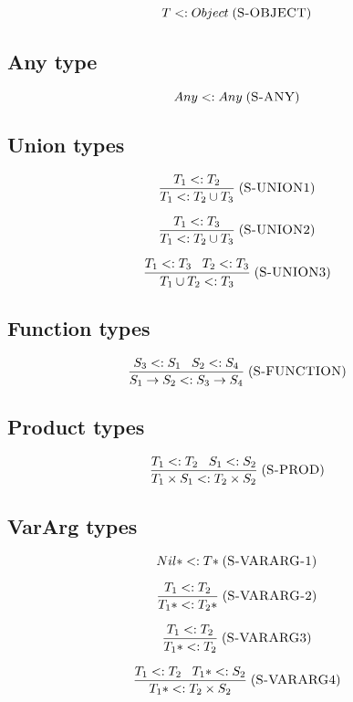 \documentclass[12pt]{article}
\newcommand{\mylabel}[1]{\; (\textsc{#1})}
\newcommand{\subtype}{<:}
\begin{document}
\[
T \subtype Object
\mylabel{S-OBJECT}
\]

\subsection{Any type}

\[
Any \subtype Any
\mylabel{S-ANY}
\]

\subsection{Union types}

\[
\frac{T_{1} \subtype T_{2}}
     {T_{1} \subtype T_{2} \cup T_{3}}
\mylabel{S-UNION1}
\]

\[
\frac{T_{1} \subtype T_{3}}
     {T_{1} \subtype T_{2} \cup T_{3}}
\mylabel{S-UNION2}
\]

\[
\frac{T_{1} \subtype T_{3} \;\;\; T_{2} \subtype T_{3}}
     {T_{1} \cup T_{2} \subtype T_{3}}
\mylabel{S-UNION3}
\]

\subsection{Function types}

\[
\frac{S_{3} \subtype S_{1} \;\;\; S_{2} \subtype S_{4}}
     {S_{1} \rightarrow S_{2} \subtype S_{3} \rightarrow S_{4}}
\mylabel{S-FUNCTION}
\]

\subsection{Product types}

\[
\frac{T_{1} \subtype T_{2} \;\;\; S_{1} \subtype S_{2}}
     {T_{1} \times S_{1} \subtype T_{2} \times S_{2}}
\mylabel{S-PROD}
\]

\subsection{VarArg types}

\[
{Nil*} \subtype {T*}
\mylabel{S-VARARG-1}
\]

\[
\frac{T_{1} \subtype T_{2}}
     {{T_{1}*} \subtype {T_{2}*}}
\mylabel{S-VARARG-2}
\]

\[
\frac{T_{1} \subtype T_{2}}
     {{T_{1}*} \subtype T_{2}}
\mylabel{S-VARARG3}
\]

\[
\frac{T_{1} \subtype T_{2} \;\;\;
      {T_{1}*} \subtype S_{2}}
     {{T_{1}*} \subtype T_{2} \times S_{2}}
\mylabel{S-VARARG4}
\]
\end{document}
